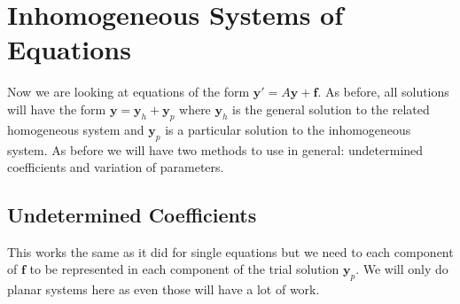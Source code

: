 \documentclass[letterpaper, 11pt, openany]{book}
\theoremstyle{mytheoremstyle}
\theoremstyle{myexamplestyle}
\begin{document}
\section{Inhomogeneous Systems of Equations}
Now we are looking at equations of the form \(\mathbf{y}' =A\mathbf{y} + \mathbf{f}\). As before, all solutions will have the form \(\mathbf{y} = \mathbf{y}_{h} + \mathbf{y}_{p}\) where \(\mathbf{y}_{h}\) is the general solution to the related homogeneous system and \(\mathbf{y}_{p}\) is a particular solution to the inhomogeneous system.
As before we will have two methods to use in general: undetermined coefficients and variation of parameters.
\subsection{Undetermined Coefficients}
This works the same as it did for single equations but we need to each component of \(\mathbf{f}\) to be represented in each component of the trial solution \(\mathbf{y}_{p}\). We will only do planar systems here as even those will have a lot of work.
\end{document}
